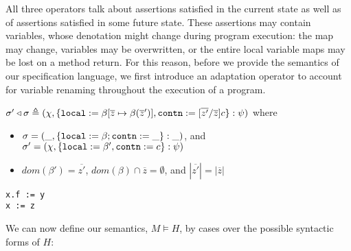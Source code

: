 All three operators talk about assertions satisfied in the 
current state as well as of assertions satisfied in some future state. 
These assertions may contain variables, whose denotation might change during
program execution: the 
map may change, variables may be overwritten, or the entire local variable maps may be lost on a method return.
For this reason, before we provide the semantics of our \Nec specification language, we first introduce an adaptation operator
to account for variable renaming throughout the execution of a program.
\begin{definition}
\label{d:adapt}
$\sigma' \triangleleft \sigma \triangleq (\chi, \{{\texttt{local}} := \beta[\overline{z} \mapsto \beta(\overline{z}')], {\texttt{contn}}:= [\overline{z'}/\overline{z}]c\} : \psi)$
where 
\begin{itemize}
\item
$\sigma = (\_, \{{\texttt{local}}:=\beta; {\texttt{contn}}:=\_\} : \_)$, and
$\sigma' = (\chi, \{{\texttt{local}}:=\beta', {\texttt{contn}}:=c\} : \psi)$
\item
$dom(\beta') = \overline{z'}$, $dom(\beta) \cap \overline{z} = \emptyset$, and $|\overline{z'}| = |\overline{z}|$
\end{itemize}
\end{definition}
\begin{lstlisting}[frame=lines]
x.f := y
x := z
\end{lstlisting}


We can now define our semantics,  $M \models H$, 
by cases over the possible syntactic forms of $H$: 


